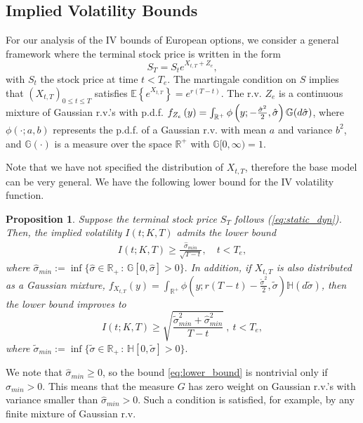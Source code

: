\documentclass[11pt]{article}
\newtheorem{prop}[theorem]{Proposition}
\numberwithin{equation}{section}
\numberwithin{theorem}{section}
\def\G{\mathbb{G}}
\def\H{\mathbb{H}}
\begin{document}
\subsection{Implied Volatility Bounds \label{sub:IV_bounds}}\label{sect-IVbounds}
For our analysis of the IV bounds of   European options, we consider a  general
framework where the terminal stock price is written in the form 
\begin{equation}
S_{T}=S_{t}e^{X_{t,T}+Z_{e}},\label{eq:static_dyn}
\end{equation}
with $S_t$ the stock price at time $t<T_e$.
The martingale condition on  $S$ implies that    $(X_{t,T})_{0\le t \le T}$  satisfies   $\mathbb{E}\left\{ e^{X_{t,T}}\right\} =e^{r(T-t)}$. The r.v.   $Z_{e}$ is a continuous mixture of Gaussian r.v.'s with  p.d.f. $f_{Z_{e}}\left(y\right)=\int_{\mathbb{R}^{+}}\phi\left(y;-\frac{\hat{\sigma}^{2}}{2},\hat{\sigma}\right)\G\text{\ensuremath{\left(d\hat{\sigma}\right)}}$,
where $\phi\left(\cdot;a,b\right)$
represents the p.d.f. of a Gaussian r.v. with mean $a$ and variance
$b^2$, and $\G\left(\cdot\right)$ is a measure
over the space $\mathbb{R}^{+}$ with $\G[0,\infty)=1$. 

 
 Note that we have not specified the distribution
of $X_{t,T}$, therefore the base model can be very general. We have
the following lower bound for the IV volatility function.



\begin{prop}
\label{prop:lower_bound}Suppose the terminal stock price $S_T$ follows (\ref{eq:static_dyn}). Then, the implied volatility $I(t;K,T)$ admits the lower bound
\begin{align}
I\left(t;K,T\right)\geq\frac{\hat{\sigma}_{min}}{\sqrt{T-t}}, \quad  t<T_{e}\label{eq:lower_bound}, 
\end{align} where $\hat{\sigma}_{min} := \inf\{ \hat{\sigma} \in \mathbb{R}_+ \,:\, \G[0, \hat{\sigma}]>0\}.$
In addition, if $X_{t,T}$ is also distributed as a Gaussian mixture,
$f_{X_{t,T}}\left(y\right)=\int_{\mathbb{R}^{+}}\phi\left(y;r(T-t)-\frac{\tilde{\sigma}^{2}}{2},\tilde{\sigma}\right)\H\left(d\tilde{\sigma}\right)$,
then the lower bound improves to
\[
I\left(t;K,T\right)\geq\sqrt{\frac{\tilde{\sigma}^{2}_{min}+\hat{\sigma}_{min}^{2}}{T-t}}\ ,\ t<T_{e},
\]
where $ \tilde{\sigma}_{min} := \inf\{ \tilde{\sigma} \in \mathbb{R}_+ \,:\, \H[0, \tilde{\sigma}] >0\}.$
\end{prop}
We note that   $\hat{\sigma}_{min} \ge 0$,  so the bound \eqref{eq:lower_bound} is nontrivial only if   $\hat{\sigma}_{min}>0$. This means that  the measure $G$ has zero weight on Gaussian r.v.'s with  variance smaller than  $\hat{\sigma}_{min}>0$. Such a  condition is satisfied, for example, by any finite  mixture of Gaussian r.v. 
\end{document}
